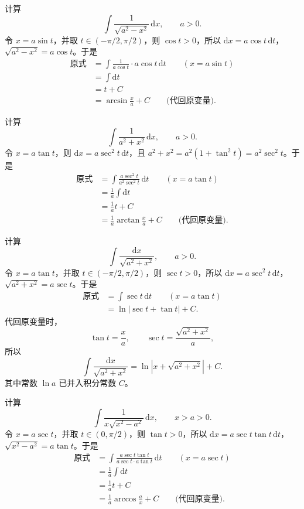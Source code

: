 \documentclass[fontset=fandol]{ctexart}
\newcommand{\dd}{\mathrm{d}}
\begin{document}
\begin{example}[反三角型积分]
计算
\[
\int \frac{1}{\sqrt{a^2-x^2}}\,\dd x,\qquad a>0.
\]
令 \(x=a\sin t\)，并取 \(t\in(-\pi/2,\pi/2)\)，则 \(\cos t>0\)，所以 \(\dd x=a\cos t\,\dd t\)，\(\sqrt{a^2-x^2}=a\cos t\)。于是
\[
\begin{aligned}
\text{原式}
&=\int \frac{1}{a\cos t}\cdot a\cos t\,\dd t\qquad (x=a\sin t)\\
&=\int\dd t\\
&=t+C\\
&=\arcsin\frac xa+C\qquad \text{(代回原变量)}.
\end{aligned}
\]
\end{example}

\begin{example}[平方和型积分]
计算
\[
\int \frac{1}{a^2+x^2}\,\dd x,\qquad a>0.
\]
令 $x=a\tan t$，则 $\dd x=a\sec^2t\,\dd t$，且 $a^2+x^2=a^2(1+\tan^2t)=a^2\sec^2t$。于是
\[
\begin{aligned}
\text{原式}
&=\int \frac{a\sec^2t}{a^2\sec^2t}\,\dd t\qquad (x=a\tan t)\\
&=\frac1a\int\dd t\\
&=\frac1a t+C\\
&=\frac1a\arctan\frac xa+C\qquad \text{(代回原变量)}.
\end{aligned}
\]
\end{example}

\begin{example}[平方和根式]
计算
\[
\int \frac{\dd x}{\sqrt{a^2+x^2}},\qquad a>0.
\]
令 \(x=a\tan t\)，并取 \(t\in(-\pi/2,\pi/2)\)，则 \(\sec t>0\)，所以 \(\dd x=a\sec^2t\,\dd t\)，\(\sqrt{a^2+x^2}=a\sec t\)。于是
\[
\begin{aligned}
\text{原式}
&=\int \sec t\,\dd t\qquad (x=a\tan t)\\
&=\ln|\sec t+\tan t|+C.
\end{aligned}
\]
代回原变量时，
\[
\tan t=\frac xa,\qquad \sec t=\frac{\sqrt{a^2+x^2}}{a},
\]
所以
\[
\int \frac{\dd x}{\sqrt{a^2+x^2}}
=\ln\left|x+\sqrt{a^2+x^2}\right|+C.
\]
其中常数 $\ln a$ 已并入积分常数 $C$。
\end{example}

\begin{example}[平方差分母]
计算
\[
\int \frac{1}{x\sqrt{x^2-a^2}}\,\dd x,\qquad x>a>0.
\]
令 \(x=a\sec t\)，并取 \(t\in(0,\pi/2)\)，则 \(\tan t>0\)，所以 \(\dd x=a\sec t\tan t\,\dd t\)，\(\sqrt{x^2-a^2}=a\tan t\)。于是
\[
\begin{aligned}
\text{原式}
&=\int \frac{a\sec t\tan t}{a\sec t\cdot a\tan t}\,\dd t\qquad (x=a\sec t)\\
&=\frac1a\int\dd t\\
&=\frac1a t+C\\
&=\frac1a\arccos\frac ax+C\qquad \text{(代回原变量)}.
\end{aligned}
\]
\end{example}
\end{document}
